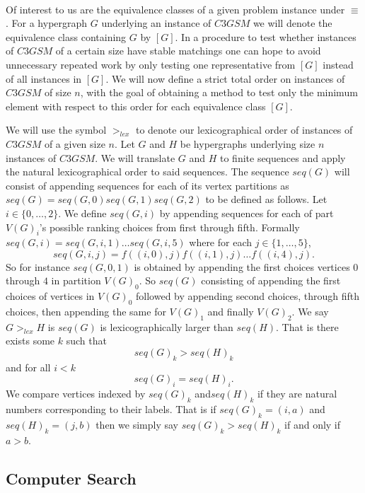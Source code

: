 \paragraph{}
Of interest to us are the equivalence classes of a given problem instance under $\equiv$. For a hypergraph $G$ underlying an instance of $C3GSM$ we will denote the equivalence class containing $G$ by $[G]$. In a procedure to test whether instances of $C3GSM$ of a certain size have stable matchings one can hope to avoid unnecessary repeated work by only testing one representative from $[G]$ instead of all instances in $[G]$. We will now define a strict total order on instances of $C3GSM$ of size $n$, with the goal of obtaining a method to test only the minimum element with respect to this order for each equivalence class $[G]$.
\begin{definition}
We will use the symbol $>_{lex}$ to denote our lexicographical order of instances of $C3GSM$ of a given size $n$. Let $G$ and $H$ be hypergraphs underlying size $n$ instances of $C3GSM$. We will translate $G$ and $H$ to finite sequences and apply the natural lexicographical order to said sequences. The sequence $seq(G)$ will consist of appending sequences for each of its vertex partitions as $seq(G) = seq(G,0)seq(G,1)seq(G,2)$ to be defined as follows. Let $i \in \{0,\dots, 2\}$.  We define $seq(G,i)$ by appending sequences for each of part $V(G)_i$'s possible ranking choices from first through fifth. Formally $seq(G,i) = seq(G,i,1)\dots seq(G,i,5)$ where for each $j \in \{1,\dots, 5\}$,
$$seq(G,i,j) = f((i,0),j)f((i,1),j)\dots f((i,4),j).$$
So for instance $seq(G,0, 1)$ is obtained by appending the first choices vertices $0$ through $4$ in partition $V(G)_0$. So $seq(G)$ consisting of appending the first choices of vertices in $V(G)_0$ followed by appending second choices, through fifth choices, then appending the same for $V(G)_1$ and finally $V(G)_2$.
We say $G >_{lex} H$ is $seq(G)$ is lexicographically larger than $seq(H)$. That is there exists some $k$ such that
$$seq(G)_k > seq(H)_k$$
and for all $i < k$
$$seq(G)_i = seq(H)_i.$$
We compare vertices indexed by $seq(G)_k$ and$ seq(H)_k$ if they are natural numbers corresponding to their labels. That is if $seq(G)_k = (i,a)$ and $seq(H)_k = (j,b)$ then we simply say $seq(G)_k > seq(H)_k$ if and only if $a>b$. 
\end{definition}
\subsection{Computer Search}
